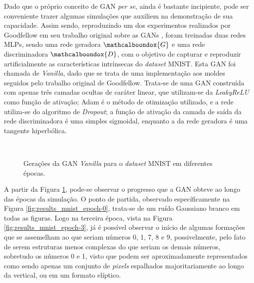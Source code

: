 Dado que o próprio conceito de GAN \textit{per se}, ainda é bastante incipiente, pode ser conveniente trazer algumas simulações que auxiliem na demonstração de sua capacidade. Assim sendo, reproduzindo um dos experimentos realizados por Goodfellow em seu trabalho original sobre as GANs \citep{NIPS2014_5423}, foram treinadas duas redes MLPs, sendo uma rede geradora $\mathcalboondox{G}$ e uma rede discriminadora $\mathcalboondox{D}$, com o objetivo de capturar e reproduzir artificialmente as características intrínsecas do \textit{dataset} MNIST. Esta GAN foi chamada de \textit{Vanilla}, dado que se trata de uma implementação aos moldes seguidos pelo trabalho original de Goodfellow. Trata-se de uma GAN construída com apenas três camadas ocultas de caráter linear, que utilizam-se da \textit{LeakyReLU} como função de ativação; Adam é o método de otimização utilizado, e a rede utiliza-se do algoritmo de \textit{Dropout}; a função de ativação da camada de saída da rede discriminadora é uma simples sigmoidal, enquanto a da rede geradora é uma tangente hiperbólica.




\begin{figure}[H]
    \centering
    \hspace{0.5cm}
    \\
    \vspace{0.5cm}
    \hspace{0.5cm}
    \caption{Gerações da GAN \textit{Vanilla} para o \textit{dataset} MNIST em diferentes épocas.}
    \label{fig:results_mnist}
\end{figure}

A partir da Figura \ref{fig:results_mnist}, pode-se observar o progresso que a GAN obteve ao longo das épocas da simulação. O ponto de partida, observado específicamente na Figura \ref{fig:results_mnist_epoch-0}, trata-se de um ruído Gaussiano branco em todas as figuras. Logo na terceira época, vista na Figura \ref{fig:results_mnist_epoch-3}, já é possível observar o início de algumas formações que se assemelham ao que seriam números 0, 1, 7, 8 e 9, possivelmente, pelo fato de serem estruturas menos complexas do que seriam os demais números, sobretudo os números 0 e 1, visto que podem ser aproximadamente representados como sendo apenas um conjunto de \textit{pixels} espalhados majoritariamente ao longo da vertical, ou em um formato elíptico.

